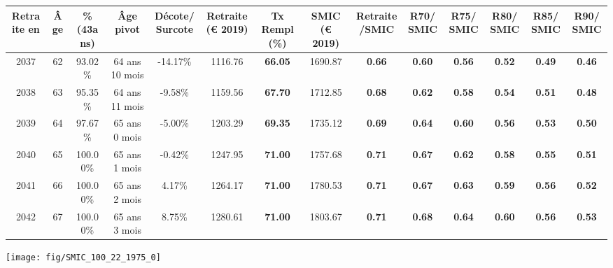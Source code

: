 \begin{adjustbox}{max width=\textwidth} 
\begin{tabular}[htb]{|c|c||c|c|c||c|c||c|c||c|c|c|c|c|} 
\hline 
 Retraite en &  Âge &  \%(43ans) &  Âge pivot &  Décote/Surcote &  Retraite (\euro{} 2019) &  Tx Rempl(\%) &  SMIC (\euro{} 2019) &  Retraite/SMIC &  R70/SMIC &  R75/SMIC &  R80/SMIC &  R85/SMIC &  R90/SMIC \\ 
\hline \hline 
 2037 &  62 &  93.02\% &  64 ans 10 mois &  -14.17\% &  1116.76 &  {\bf 66.05} &  1690.87 &  {\bf {\color{red} 0.66}} &  {\bf {\color{red} 0.60}} &  {\bf {\color{red} 0.56}} &  {\bf {\color{red} 0.52}} &  {\bf {\color{red} 0.49}} &  {\bf {\color{red} 0.46}} \\ 
\hline 
 2038 &  63 &  95.35\% &  64 ans 11 mois &  -9.58\% &  1159.56 &  {\bf 67.70} &  1712.85 &  {\bf {\color{red} 0.68}} &  {\bf {\color{red} 0.62}} &  {\bf {\color{red} 0.58}} &  {\bf {\color{red} 0.54}} &  {\bf {\color{red} 0.51}} &  {\bf {\color{red} 0.48}} \\ 
\hline 
 2039 &  64 &  97.67\% &  65 ans 0 mois &  -5.00\% &  1203.29 &  {\bf 69.35} &  1735.12 &  {\bf {\color{red} 0.69}} &  {\bf {\color{red} 0.64}} &  {\bf {\color{red} 0.60}} &  {\bf {\color{red} 0.56}} &  {\bf {\color{red} 0.53}} &  {\bf {\color{red} 0.50}} \\ 
\hline 
 2040 &  65 &  100.00\% &  65 ans 1 mois &  -0.42\% &  1247.95 &  {\bf 71.00} &  1757.68 &  {\bf {\color{red} 0.71}} &  {\bf {\color{red} 0.67}} &  {\bf {\color{red} 0.62}} &  {\bf {\color{red} 0.58}} &  {\bf {\color{red} 0.55}} &  {\bf {\color{red} 0.51}} \\ 
\hline 
 2041 &  66 &  100.00\% &  65 ans 2 mois &  4.17\% &  1264.17 &  {\bf 71.00} &  1780.53 &  {\bf {\color{red} 0.71}} &  {\bf {\color{red} 0.67}} &  {\bf {\color{red} 0.63}} &  {\bf {\color{red} 0.59}} &  {\bf {\color{red} 0.56}} &  {\bf {\color{red} 0.52}} \\ 
\hline 
 2042 &  67 &  100.00\% &  65 ans 3 mois &  8.75\% &  1280.61 &  {\bf 71.00} &  1803.67 &  {\bf {\color{red} 0.71}} &  {\bf {\color{red} 0.68}} &  {\bf {\color{red} 0.64}} &  {\bf {\color{red} 0.60}} &  {\bf {\color{red} 0.56}} &  {\bf {\color{red} 0.53}} \\ 
\hline 
\hline 
\end{tabular} 
\end{adjustbox} 
 
 \vspace{0.1cm} 

 {\hspace{-2.2cm}\texttt{[image: fig/SMIC\_100\_22\_1975\_0]}} 

